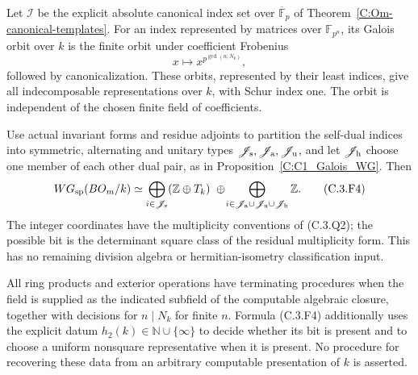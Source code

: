\begin{theorem}
\label{C:all_algebraic_fields_WG}
Let $\mathscr I$ be the explicit absolute canonical index set over
$\overline{\mathbb F}_p$ of
Theorem~\ref{C:Om-canonical-templates}. For an index represented
by matrices over $\mathbb F_{p^n}$, its Galois orbit over $k$
is the finite orbit under coefficient Frobenius
\[
                    x\longmapsto x^{p^{\gcd(n,N_k)}},       \tag{C.3.F3}
\]
followed by canonicalization. These orbits, represented by their
least indices, give all indecomposable representations over $k$,
with Schur index one. The orbit is independent of the chosen
finite field of coefficients.

Use actual invariant forms and residue adjoints to partition the
self-dual indices into symmetric, alternating and unitary types
$\mathscr J_{\rm s},\mathscr J_{\rm a},\mathscr J_{\rm u}$,
and let $\mathscr J_{\rm h}$ choose one member of each other dual
pair, as in Proposition~\ref{C:C1_Galois_WG}. Then
\[
 WG_{\rm sp}(BO_m/k)\simeq
 \bigoplus_{i\in\mathscr J_{\rm s}}(\mathbb Z\oplus T_k)
 \ \oplus\!
 \bigoplus_{i\in\mathscr J_{\rm a}\cup\mathscr J_{\rm u}
                         \cup\mathscr J_{\rm h}}\mathbb Z .\tag{C.3.F4}
\]
The integer coordinates have the multiplicity conventions of
(C.3.Q2); the possible bit is the determinant square class of
the residual multiplicity form. This has no remaining division
algebra or hermitian-isometry classification input.

All ring products and exterior operations have terminating
procedures when the field is supplied as the indicated subfield
of the computable algebraic closure, together with decisions for
$n\mid N_k$ for finite $n$. Formula (C.3.F4) additionally uses
the explicit datum $h_2(k)\in\mathbb N\cup\{\infty\}$ to
decide whether its bit is present and to choose a uniform
nonsquare representative when it is present. No procedure for
recovering these data from an arbitrary computable presentation
of $k$ is asserted.
\end{theorem}
